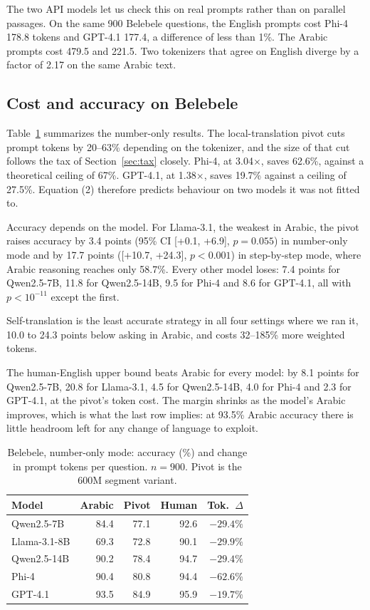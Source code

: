 \documentclass[conference,a4paper]{IEEEtran}
\begin{document}
The two API models let us check this on real prompts rather than on parallel
passages. On the same 900 Belebele questions, the English prompts cost Phi-4
178.8 tokens and GPT-4.1 177.4, a difference of less than 1\%. The Arabic
prompts cost 479.5 and 221.5. Two tokenizers that agree on English diverge by a
factor of 2.17 on the same Arabic text.

\subsection{Cost and accuracy on Belebele}
\label{sec:belebele}

Table~\ref{tab:belebele} summarizes the number-only results. The
local-translation pivot cuts prompt tokens by 20--63\% depending on the
tokenizer, and the size of that cut follows the tax of
Section~\ref{sec:tax} closely. Phi-4,
at 3.04$\times$, saves 62.6\%, against a theoretical ceiling of 67\%. GPT-4.1,
at 1.38$\times$, saves 19.7\% against a ceiling of 27.5\%. Equation (2)
therefore predicts behaviour on two models it was not fitted to.

Accuracy depends on the model. For Llama-3.1, the weakest in Arabic, the pivot
raises accuracy by 3.4 points (95\% CI [+0.1, +6.9], $p = 0.055$) in
number-only mode and by 17.7 points ([+10.7, +24.3], $p < 0.001$) in
step-by-step mode, where Arabic reasoning reaches only 58.7\%. Every other
model loses: 7.4 points for Qwen2.5-7B, 11.8 for Qwen2.5-14B, 9.5 for Phi-4 and
8.6 for GPT-4.1, all with $p < 10^{-11}$ except the first.

Self-translation is the least accurate strategy in all four settings where we
ran it, 10.0 to 24.3 points below asking in Arabic, and costs 32--185\% more
weighted tokens.

The human-English upper bound beats Arabic for every model: by 8.1 points for
Qwen2.5-7B, 20.8 for Llama-3.1, 4.5 for Qwen2.5-14B, 4.0 for Phi-4 and 2.3 for
GPT-4.1, at the pivot's token cost. The margin shrinks as the model's Arabic
improves, which is what the last row implies: at 93.5\% Arabic accuracy there
is little headroom left for any change of language to exploit.

\begin{table}[t]
\caption{Belebele, number-only mode: accuracy (\%) and change in prompt tokens
per question. $n = 900$. Pivot is the 600M segment variant.}
\label{tab:belebele}
\centering
\footnotesize
\setlength{\tabcolsep}{4pt}
\begin{tabular}{lrrrr}
\toprule
Model & Arabic & Pivot & Human & Tok.\ $\Delta$ \\
\midrule
Qwen2.5-7B   & 84.4 & 77.1 & 92.6 & $-29.4\%$ \\
Llama-3.1-8B & 69.3 & 72.8 & 90.1 & $-29.9\%$ \\
Qwen2.5-14B  & 90.2 & 78.4 & 94.7 & $-29.4\%$ \\
Phi-4        & 90.4 & 80.8 & 94.4 & $-62.6\%$ \\
GPT-4.1      & 93.5 & 84.9 & 95.9 & $-19.7\%$ \\
\bottomrule
\end{tabular}
\end{table}
\end{document}
